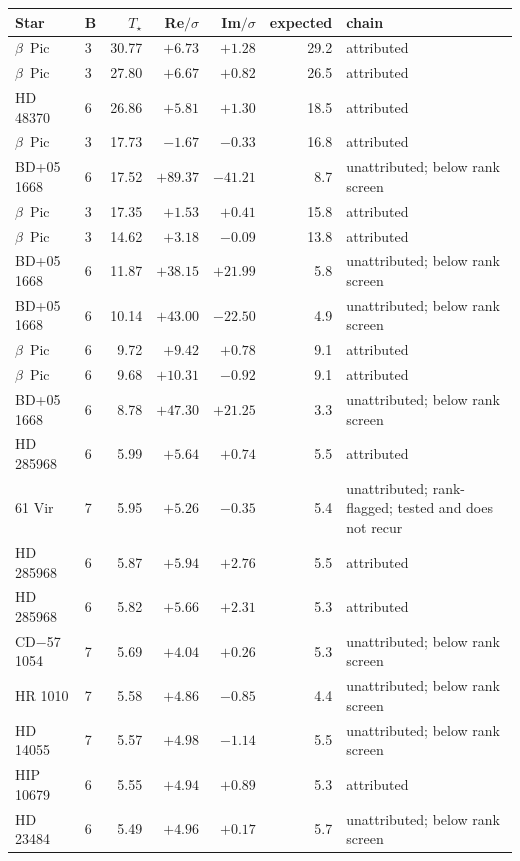 \begin{tabular}{@{}llrrrrl@{}}
\toprule
Star & B & $T_\star$ & Re$/\sigma$ & Im$/\sigma$ & expected & chain \\
\midrule
$\beta$~Pic & 3 & 30.77 & $+6.73$ & $+1.28$ & 29.2 & attributed \\
$\beta$~Pic & 3 & 27.80 & $+6.67$ & $+0.82$ & 26.5 & attributed \\
HD 48370 & 6 & 26.86 & $+5.81$ & $+1.30$ & 18.5 & attributed \\
$\beta$~Pic & 3 & 17.73 & $-1.67$ & $-0.33$ & 16.8 & attributed \\
BD+05 1668 & 6 & 17.52 & $+89.37$ & $-41.21$ & 8.7 & unattributed; below rank screen \\
$\beta$~Pic & 3 & 17.35 & $+1.53$ & $+0.41$ & 15.8 & attributed \\
$\beta$~Pic & 3 & 14.62 & $+3.18$ & $-0.09$ & 13.8 & attributed \\
BD+05 1668 & 6 & 11.87 & $+38.15$ & $+21.99$ & 5.8 & unattributed; below rank screen \\
BD+05 1668 & 6 & 10.14 & $+43.00$ & $-22.50$ & 4.9 & unattributed; below rank screen \\
$\beta$~Pic & 6 & 9.72 & $+9.42$ & $+0.78$ & 9.1 & attributed \\
$\beta$~Pic & 6 & 9.68 & $+10.31$ & $-0.92$ & 9.1 & attributed \\
BD+05 1668 & 6 & 8.78 & $+47.30$ & $+21.25$ & 3.3 & unattributed; below rank screen \\
HD 285968 & 6 & 5.99 & $+5.64$ & $+0.74$ & 5.5 & attributed \\
61 Vir & 7 & 5.95 & $+5.26$ & $-0.35$ & 5.4 & unattributed; rank-flagged; tested and does not recur \\
HD 285968 & 6 & 5.87 & $+5.94$ & $+2.76$ & 5.5 & attributed \\
HD 285968 & 6 & 5.82 & $+5.66$ & $+2.31$ & 5.3 & attributed \\
CD$-$57 1054 & 7 & 5.69 & $+4.04$ & $+0.26$ & 5.3 & unattributed; below rank screen \\
HR 1010 & 7 & 5.58 & $+4.86$ & $-0.85$ & 4.4 & unattributed; below rank screen \\
HD 14055 & 7 & 5.57 & $+4.98$ & $-1.14$ & 5.5 & unattributed; below rank screen \\
HIP 10679 & 6 & 5.55 & $+4.94$ & $+0.89$ & 5.3 & attributed \\
HD 23484 & 6 & 5.49 & $+4.96$ & $+0.17$ & 5.7 & unattributed; below rank screen \\

\end{tabular}
